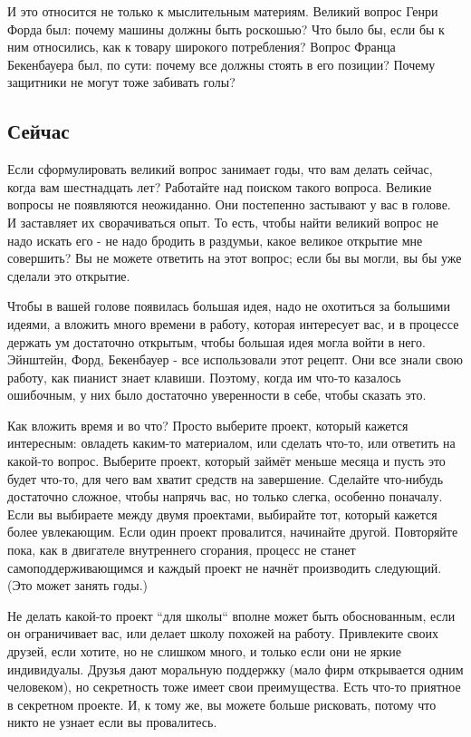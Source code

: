 \documentclass[ebook,12pt,oneside,openany]{memoir}
\begin{document}
И это относится не только к мыслительным материям. Великий вопрос
Генри Форда был: почему машины должны быть роскошью? Что было бы, если
бы к ним относились, как к товару широкого потребления? Вопрос Франца
Бекенбауера был, по сути: почему все должны стоять в его позиции?
Почему защитники не могут тоже забивать голы? \newline

\subsection{Сейчас}

Если сформулировать великий вопрос занимает годы, что вам делать
сейчас, когда вам шестнадцать лет? Работайте над поиском такого
вопроса. Великие вопросы не появляются неожиданно. Они постепенно
застывают у вас в голове. И заставляет их сворачиваться опыт. То есть,
чтобы найти великий вопрос не надо искать его - не надо бродить в
раздумьи, какое великое открытие мне совершить? Вы не можете ответить
на этот вопрос; если бы вы могли, вы бы уже сделали это открытие. \newline

Чтобы в вашей голове появилась большая идея, надо не охотиться за
большими идеями, а вложить много времени в работу, которая интересует
вас, и в процессе держать ум достаточно открытым, чтобы большая идея
могла войти в него. Эйнштейн, Форд, Бекенбауер - все использовали этот
рецепт. Они все знали свою работу, как пианист знает клавиши. Поэтому,
когда им что-то казалось ошибочным, у них было достаточно уверенности
в себе, чтобы сказать это. \newline

Как вложить время и во что? Просто выберите проект, который кажется
интересным: овладеть каким-то материалом, или сделать что-то, или
ответить на какой-то вопрос. Выберите проект, который займёт меньше
месяца и пусть это будет что-то, для чего вам хватит средств на
завершение. Сделайте что-нибудь достаточно сложное, чтобы напрячь вас,
но только слегка, особенно поначалу. Если вы выбираете между двумя
проектами, выбирайте тот, который кажется более увлекающим. Если один
проект провалится, начинайте другой. Повторяйте пока, как в двигателе
внутреннего сгорания, процесс не станет самоподдерживающимся и каждый
проект не начнёт производить следующий. (Это может занять годы.) \newline

Не делать какой-то проект ``для школы`` вполне может быть обоснованным,
если он ограничивает вас, или делает школу похожей на работу.
Привлеките своих друзей, если хотите, но не слишком много, и только
если они не яркие индивидуалы. Друзья дают моральную поддержку (мало
фирм открывается одним человеком), но секретность тоже имеет свои
преимущества. Есть что-то приятное в секретном проекте. И, к тому же,
вы можете больше рисковать, потому что никто не узнает если вы
провалитесь. \newline
\end{document}
